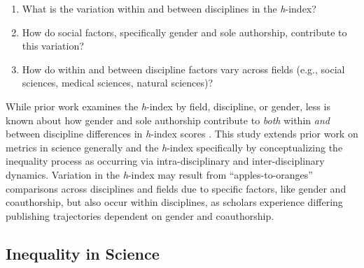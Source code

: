 \documentclass[
  10pt,
  letterpaper,
]{article}
\providecommand{\tightlist}{%
  \setlength{\itemsep}{0pt}\setlength{\parskip}{0pt}}\usepackage{longtable,booktabs,array}
\begin{document}
\begin{enumerate}
\def\labelenumi{\arabic{enumi}.}
\tightlist
\item
  What is the variation within and between disciplines in the
  \emph{h}-index?
\item
  How do social factors, specifically gender and sole authorship,
  contribute to this variation?
\item
  How do within and between discipline factors vary across fields (e.g.,
  social sciences, medical sciences, natural sciences)?
\end{enumerate}

While prior work examines the \emph{h}-index by field, discipline, or
gender, less is known about how gender and sole authorship contribute to
\emph{both} within \emph{and} between discipline differences in
\emph{h}-index scores \citep{bihari_review_2023}. This study extends
prior work on metrics in science generally and the \emph{h}-index
specifically by conceptualizing the inequality process as occurring via
intra-disciplinary and inter-disciplinary dynamics. Variation in the
\emph{h}-index may result from ``apples-to-oranges'' comparisons across
disciplines and fields due to specific factors, like gender and
coauthorship, but also occur within disciplines, as scholars experience
differing publishing trajectories dependent on gender and coauthorship.

\subsection{Inequality in Science}\label{inequality-in-science}
\end{document}
